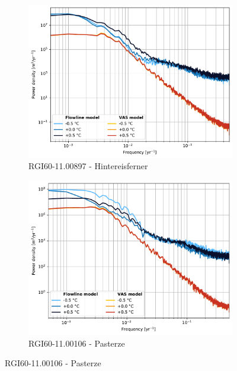       \begin{figure}[htp]
        \centering
        \begin{subfigure}[b]{0.48\textwidth}
          \caption{RGI60-11.00897 - Hintereisferner}
          \label{fig:psd:hintereisferner}
          \centering
          \includegraphics[width=\textwidth]{../plots/final_plots/psd/Hintereisferner.pdf}
        \end{subfigure}
        \hfill
        \begin{subfigure}[b]{0.48\textwidth}
          \caption{RGI60-11.00106 - Pasterze}
          \label{fig:psd:pasterze}
          \centering
          \includegraphics[width=\textwidth]{../plots/final_plots/psd/Pasterze.pdf}

\end{subfigure}
\end{figure}

